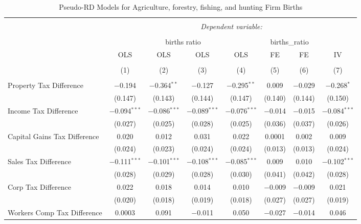 
\begin{table}[!htbp] \centering 
  \caption{Pseudo-RD Models for  Agriculture, forestry, fishing, and hunting Firm Births} 
  \label{} 
\begin{tabular}{@{\extracolsep{5pt}}lccccccc} 
\\[-1.8ex]\hline 
\hline \\[-1.8ex] 
 & \multicolumn{7}{c}{\textit{Dependent variable:}} \\ 
\cline{2-8} 
\\[-1.8ex] & \multicolumn{4}{c}{births ratio} & \multicolumn{2}{c}{births\_ratio} &   \\ 
 & OLS & OLS & OLS & OLS & FE & FE & IV \\ 
\\[-1.8ex] & (1) & (2) & (3) & (4) & (5) & (6) & (7)\\ 
\hline \\[-1.8ex] 
 Property Tax Difference & $-$0.194 & $-$0.364$^{**}$ & $-$0.127 & $-$0.295$^{**}$ & 0.009 & $-$0.029 & $-$0.268$^{*}$ \\ 
  & (0.147) & (0.143) & (0.144) & (0.147) & (0.140) & (0.144) & (0.150) \\ 
  Income Tax Difference & $-$0.094$^{***}$ & $-$0.086$^{***}$ & $-$0.089$^{***}$ & $-$0.076$^{***}$ & $-$0.014 & $-$0.015 & $-$0.084$^{***}$ \\ 
  & (0.027) & (0.025) & (0.028) & (0.025) & (0.036) & (0.037) & (0.026) \\ 
  Capital Gains Tax Difference & 0.020 & 0.012 & 0.031 & 0.022 & 0.0001 & 0.002 & 0.009 \\ 
  & (0.024) & (0.023) & (0.024) & (0.024) & (0.013) & (0.013) & (0.024) \\ 
  Sales Tax Difference & $-$0.111$^{***}$ & $-$0.101$^{***}$ & $-$0.108$^{***}$ & $-$0.085$^{***}$ & 0.009 & 0.010 & $-$0.102$^{***}$ \\ 
  & (0.028) & (0.029) & (0.028) & (0.030) & (0.041) & (0.042) & (0.028) \\ 
  Corp Tax Difference & 0.022 & 0.018 & 0.014 & 0.010 & $-$0.009 & $-$0.009 & 0.021 \\ 
  & (0.020) & (0.018) & (0.019) & (0.018) & (0.027) & (0.027) & (0.019) \\ 
  Workers Comp Tax Difference & 0.0003 & 0.091 & $-$0.011 & 0.050 & $-$0.027 & $-$0.014 & 0.046 \\ 

\end{tabular}
\end{table}
